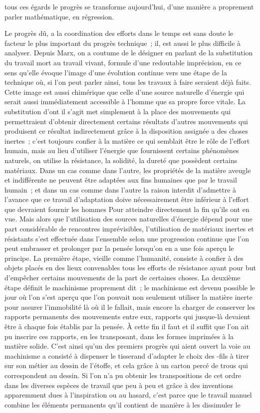 \documentclass[french,twoside]{book} %
\begin{document}
tous ces égards le progrès se transforme aujourd'hui, d'une manière a proprement parler mathématique, en régression.\par
Le progrès dû, a la coordination des efforts dans le temps est sans doute le facteur le plus important du progrès technique ; il, est aussi le plus difficile à analyser. Depuis Marx, on a coutume de le désigner en parlant de la substitution du travail mort au travail vivant, formule d'une redoutable imprécision, en ce sens qu'elle évoque l'image d'une évolution continue vers une étape de la technique où, si l'on peut parler ainsi, tous les travaux à faire seraient déjà faits. Cette image est aussi chimérique que celle d'une source naturelle d'énergie qui serait aussi immédiatement accessible à l'homme que sa propre force vitale. La substitution d'ont il s'agit met simplement à la place des mouvements qui permettraient d'obtenir directement certains résultats d'autres mouvements qui produisent ce résultat indirectement grâce à la disposition assignée a des choses inertes ; c'est toujours confier à la matière ce qui semblait être le rôle de l'effort humain, mais au lieu d'utiliser l'énergie que fournissent certains phénomènes naturels, on utilise la résistance, la solidité, la dureté que possèdent certains matériaux. Dans un cas comme dans l'autre, les propriétés de la matière aveugle et indifférente ne peuvent être adaptées aux fins humaines que par le travail humain ; et dans un cas comme dans l'autre la raison interdit d'admettre à l’avance que ce travail d'adaptation doive nécessairement être inférieur à l'effort que devraient fournir les hommes Pour atteindre directement la fin qu'ils ont en vue. Mais alors que l'utilisation des sources naturelles d'énergie dépend pour une part considérable de rencontres imprévisibles, l'utilisation de matériaux inertes et résistants s'est effectuée dans l'ensemble selon une progression continue que l'on peut embrasser et prolonger par la pensée lorsqu'on en a une fois aperçu le principe. La première étape, vieille comme l'humanité, consiste à confier à des objets placés en des lieux convenables tous les efforts de résistance ayant pour but d'empêcher certains mouvements de la part de certaines choses. La deuxième étape définit le machinisme proprement dit ; le machinisme est devenu possible le jour où l'on s'est aperçu que l'on pouvait non seulement utiliser la matière inerte pour assurer l'immobilité là où il le fallait, mais encore la charger de conserver les rapports permanents des mouvements entre eux, rapports qui jusque-là devaient être à chaque fois établis par la pensée. À cette fin il faut et il suffit que l'on ait pu inscrire ces rapports, en les transposant, dans les formes imprimées à la matière solide. C'est ainsi qu'un des premiers progrès qui aient ouvert la voie au machinisme a consisté à dispenser le tisserand d'adapter le choix des -fils à tirer sur son métier au dessin de l'étoffe, et cela grâce à un carton percé de trous qui correspondent au dessin. Si l'on n'a pu obtenir les transpositions de cet ordre dans les diverses espèces de travail que peu à peu et grâce à des inventions apparemment dues à l'inspiration ou au hasard, c'est parce que le travail manuel combine les éléments permanents qu'il contient de manière à les dissimuler le 
\end{document}

